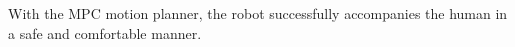 \documentclass[journal]{IEEEtran}
\newcommand{\todonote}[1]{\vspace{0px} %
	\todo[inline, color=green!30]{\textbf{[Note:]} {#1}} %
}
\newcommand{\todohere}[1]{\hl{(\textbf{TODO:} #1)}}
\DeclareRobustCommand{\clnote}[1]{\ifthenelse{\boolean{include-notes}}%
{\textcolor{orange}{\textbf{CL: #1}}}{}}
\begin{document}
	With the MPC motion planner, the robot successfully accompanies the human in a safe and comfortable manner.
	
	
\end{document}
